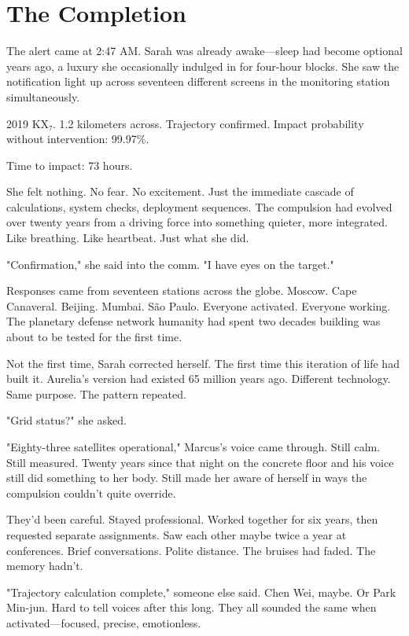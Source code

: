 \chapter{The Completion}
\label{ch:30}


The alert came at 2:47 AM. Sarah was already awake—sleep had become optional years ago, a luxury she occasionally indulged in for four-hour blocks. She saw the notification light up across seventeen different screens in the monitoring station simultaneously.

2019 KX₇. 1.2 kilometers across. Trajectory confirmed. Impact probability without intervention: 99.97\%.

Time to impact: 73 hours.

She felt nothing. No fear. No excitement. Just the immediate cascade of calculations, system checks, deployment sequences. The compulsion had evolved over twenty years from a driving force into something quieter, more integrated. Like breathing. Like heartbeat. Just what she did.

"Confirmation," she said into the comm. "I have eyes on the target."

Responses came from seventeen stations across the globe. Moscow. Cape Canaveral. Beijing. Mumbai. São Paulo. Everyone activated. Everyone working. The planetary defense network humanity had spent two decades building was about to be tested for the first time.

Not the first time, Sarah corrected herself. The first time this iteration of life had built it. Aurelia's version had existed 65 million years ago. Different technology. Same purpose. The pattern repeated.

"Grid status?" she asked.

"Eighty-three satellites operational," Marcus's voice came through. Still calm. Still measured. Twenty years since that night on the concrete floor and his voice still did something to her body. Still made her aware of herself in ways the compulsion couldn't quite override.

They'd been careful. Stayed professional. Worked together for six years, then requested separate assignments. Saw each other maybe twice a year at conferences. Brief conversations. Polite distance. The bruises had faded. The memory hadn't.

"Trajectory calculation complete," someone else said. Chen Wei, maybe. Or Park Min-jun. Hard to tell voices after this long. They all sounded the same when activated—focused, precise, emotionless.

